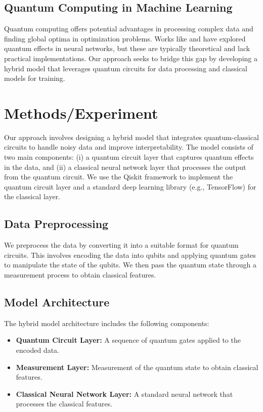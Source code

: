 \documentclass{article}
\begin{document}
\subsection{Quantum Computing in Machine Learning}
Quantum computing offers potential advantages in processing complex data and finding global optima in optimization problems. Works like \cite{kominis2026searchingquantumeffectsbrain} and \cite{caprioti2026learninglearningphysicspath} have explored quantum effects in neural networks, but these are typically theoretical and lack practical implementations. Our approach seeks to bridge this gap by developing a hybrid model that leverages quantum circuits for data processing and classical models for training.

\section{Methods/Experiment}
Our approach involves designing a hybrid model that integrates quantum-classical circuits to handle noisy data and improve interpretability. The model consists of two main components: (i) a quantum circuit layer that captures quantum effects in the data, and (ii) a classical neural network layer that processes the output from the quantum circuit. We use the Qiskit framework to implement the quantum circuit layer and a standard deep learning library (e.g., TensorFlow) for the classical layer.

\subsection{Data Preprocessing}
We preprocess the data by converting it into a suitable format for quantum circuits. This involves encoding the data into qubits and applying quantum gates to manipulate the state of the qubits. We then pass the quantum state through a measurement process to obtain classical features.

\subsection{Model Architecture}
The hybrid model architecture includes the following components:
\begin{itemize}
    \item \textbf{Quantum Circuit Layer:} A sequence of quantum gates applied to the encoded data.
    \item \textbf{Measurement Layer:} Measurement of the quantum state to obtain classical features.
    \item \textbf{Classical Neural Network Layer:} A standard neural network that processes the classical features.
\end{itemize}
\end{document}
